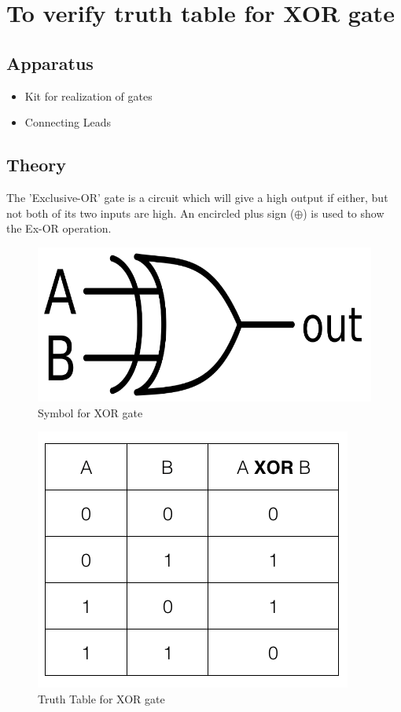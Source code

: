 \chapter{To verify truth table for XOR gate}

\section{Apparatus}
	\begin{itemize}
		\tightlist
		\item Kit for realization of gates
		\item Connecting Leads
	\end{itemize}

\section{Theory}
	The 'Exclusive-OR' gate is a circuit which will give a high output if either, but not both of its two inputs are high. An encircled plus sign ($\oplus$) is used to show the Ex-OR operation.
	\begin{figure}[h]
		\centering
		\includegraphics{img/exp6/1}
		\caption{Symbol for XOR gate}
		\label{fig:6:1}
	\end{figure}
	\begin{figure}[h]
		\centering
		\includegraphics{img/exp6/2}
		\caption{Truth Table for XOR gate}
		\label{fig:6:2}
	\end{figure}
	
